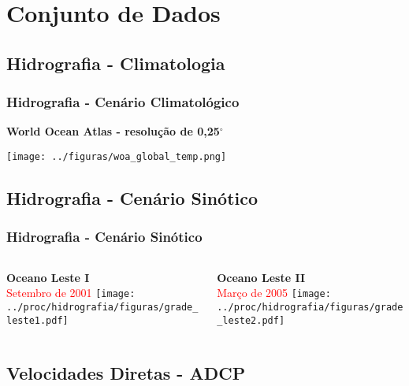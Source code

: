 \documentclass[pdftex]{beamer}
\begin{document}
\section[Dados]{Conjunto de Dados}

\subsection[Climatologia]{Hidrografia - Climatologia}

\frame
{
  \frametitle{Hidrografia - Cenário Climatológico}
\begin{center}
{\bf World Ocean Atlas - resolução de 0,25$^\circ$}
\end{center}
\begin{center}
\texttt{[image: ../figuras/woa\_global\_temp.png]}
\end{center}
}

\subsection[Cenário Sinótico]{Hidrografia - Cenário Sinótico}

\frame
{
  \frametitle{Hidrografia - Cenário Sinótico}
\vspace{-0.5cm}
\begin{columns}
  \begin{column}{6cm}
    \begin{center}
    {\bf Oceano Leste I}\\
    \textcolor{red}{Setembro de 2001}
    \texttt{[image: ../proc/hidrografia/figuras/grade\_leste1.pdf]}
    \end{center}
  \end{column}
  \begin{column}{6cm}
    \begin{center}
    {\bf Oceano Leste II}\\
    \textcolor{red}{Março de 2005}
    \texttt{[image: ../proc/hidrografia/figuras/grade\_leste2.pdf]}
    \end{center}
  \end{column}
\end{columns} 
}


\subsection[ADCP]{Velocidades Diretas - ADCP}
\end{document}
